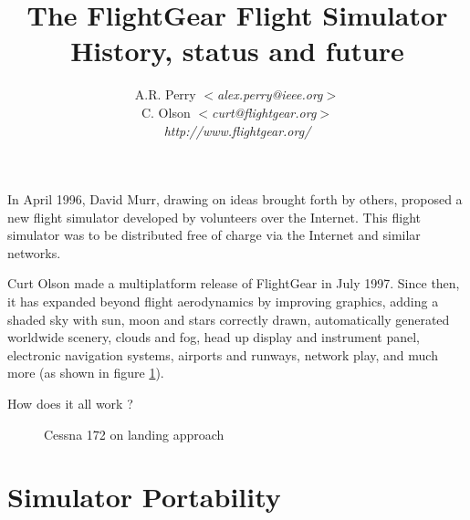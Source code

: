 \documentclass[a4paper,10pt]{article}
\title{\Large\textbf{%
The FlightGear Flight Simulator\\
History, status and future
}}
\author{A.R. Perry \textsl{$<$alex.perry@ieee.org$>$}\\
        C. Olson \textsl{$<$curt@flightgear.org$>$}\\
        \textsl{http://www.flightgear.org/}}
\begin{document}
\renewcommand{\thepage}{}

\sloppy{}
%
%
%
In April 1996, David Murr, drawing on ideas
brought forth by others, proposed a new flight simulator developed by
volunteers over the Internet. This flight simulator was to be
distributed free of charge via the Internet and similar networks.

Curt Olson made a multiplatform release of FlightGear\cite{fgfs} in July 1997.
Since then, it has expanded beyond flight aerodynamics by improving graphics,
adding a shaded sky with
sun, moon and stars correctly drawn, automatically generated worldwide
scenery, clouds and fog, head up display and instrument panel,
electronic navigation systems, airports and runways, network play,
and much more (as shown in figure \ref{fig:c172}).

How does it all work ?
%
%
%
\begin{figure}
\begin{center}\end{center}
\caption{Cessna 172 on landing approach}
\label{fig:c172}
\end{figure}
%
%
\section*{Simulator Portability}
\end{document}
